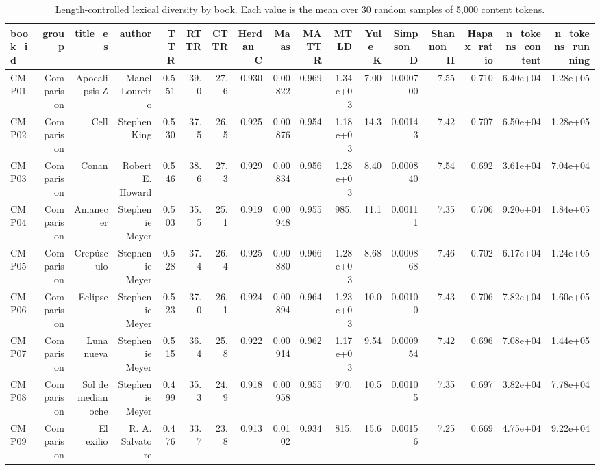 \begin{table}[htbp]
\centering
\small
\caption{Length-controlled lexical diversity by book. Each value is the mean over 30 random samples of 5,000 content tokens.}
\label{tab:lexical-by-book}
\begin{tabular}{lrrrrrrrrrrrrrrrr}
\toprule
\textbf{book\_id} & \textbf{group} & \textbf{title\_es} & \textbf{author} & \textbf{TTR} & \textbf{RTTR} & \textbf{CTTR} & \textbf{Herdan\_C} & \textbf{Maas} & \textbf{MATTR} & \textbf{MTLD} & \textbf{Yule\_K} & \textbf{Simpson\_D} & \textbf{Shannon\_H} & \textbf{Hapax\_ratio} & \textbf{n\_tokens\_content} & \textbf{n\_tokens\_running} \\
\midrule
CMP01 & Comparison & Apocalipsis Z & Manel Loureiro & 0.551 & 39.0 & 27.6 & 0.930 & 0.00822 & 0.969 & 1.34e+03 & 7.00 & 0.000700 & 7.55 & 0.710 & 6.40e+04 & 1.28e+05 \\
CMP02 & Comparison & Cell & Stephen King & 0.530 & 37.5 & 26.5 & 0.925 & 0.00876 & 0.954 & 1.18e+03 & 14.3 & 0.00143 & 7.42 & 0.707 & 6.50e+04 & 1.28e+05 \\
CMP03 & Comparison & Conan & Robert E. Howard & 0.546 & 38.6 & 27.3 & 0.929 & 0.00834 & 0.956 & 1.28e+03 & 8.40 & 0.000840 & 7.54 & 0.692 & 3.61e+04 & 7.04e+04 \\
CMP04 & Comparison & Amanecer & Stephenie Meyer & 0.503 & 35.5 & 25.1 & 0.919 & 0.00948 & 0.955 & 985. & 11.1 & 0.00111 & 7.35 & 0.706 & 9.20e+04 & 1.84e+05 \\
CMP05 & Comparison & Crepúsculo & Stephenie Meyer & 0.528 & 37.4 & 26.4 & 0.925 & 0.00880 & 0.966 & 1.28e+03 & 8.68 & 0.000868 & 7.46 & 0.702 & 6.17e+04 & 1.24e+05 \\
CMP06 & Comparison & Eclipse & Stephenie Meyer & 0.523 & 37.0 & 26.1 & 0.924 & 0.00894 & 0.964 & 1.23e+03 & 10.0 & 0.00100 & 7.43 & 0.706 & 7.82e+04 & 1.60e+05 \\
CMP07 & Comparison & Luna nueva & Stephenie Meyer & 0.515 & 36.4 & 25.8 & 0.922 & 0.00914 & 0.962 & 1.17e+03 & 9.54 & 0.000954 & 7.42 & 0.696 & 7.08e+04 & 1.44e+05 \\
CMP08 & Comparison & Sol de medianoche & Stephenie Meyer & 0.499 & 35.3 & 24.9 & 0.918 & 0.00958 & 0.955 & 970. & 10.5 & 0.00105 & 7.35 & 0.697 & 3.82e+04 & 7.78e+04 \\
CMP09 & Comparison & El exilio & R. A. Salvatore & 0.476 & 33.7 & 23.8 & 0.913 & 0.0102 & 0.934 & 815. & 15.6 & 0.00156 & 7.25 & 0.669 & 4.75e+04 & 9.22e+04 \\

\end{tabular}
\end{table}
